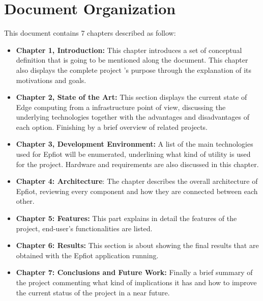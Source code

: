 \section{Document Organization}
\label{makereference1.3}

This document contains 7 chapters described as follow:

\begin{itemize}
  \item \textbf{Chapter 1, Introduction:} This chapter introduces a set of conceptual definition that is going to be mentioned along the document. This chapter also displays the complete project 's purpose through the explanation of its motivations and goals.
  \item \textbf{Chapter 2, State of the Art:} This section displays the current state of Edge computing from a infrastructure point of view, discussing the underlying technologies together with the advantages and disadvantages of each option. Finishing by a brief overview of related projects.
  \item \textbf{Chapter 3, Development Environment:} A list of the main technologies used for Epfiot will be enumerated, underlining what kind of utility is used for the project. Hardware and requirements are also discussed in this chapter.
  \item \textbf{Chapter 4: Architecture}: The chapter describes the overall architecture of Epfiot, reviewing every component and how they are connected between each other. 
  \item \textbf{Chapter 5: Features:} This part explains in detail the features of the project, end-user's functionalities are listed.   
  \item \textbf{Chapter 6: Results:} This section is about showing the final results that are obtained with the Epfiot application running. 
  \item \textbf{Chapter 7: Conclusions and Future Work:} Finally a brief summary of the project commenting what kind of implications it has and how to improve the current status of the project in a near future. 
\end{itemize}

